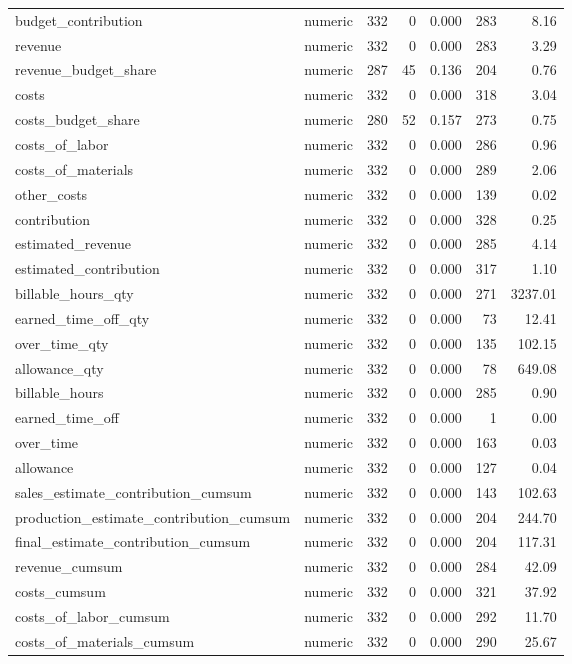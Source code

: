 \begin{landscape}
\begin{longtable}[t]{llrrrrr}
budget\_contribution & numeric & 332 & 0 & 0.000 & 283 & 8.16\\
revenue & numeric & 332 & 0 & 0.000 & 283 & 3.29\\
revenue\_budget\_share & numeric & 287 & 45 & 0.136 & 204 & 0.76\\
costs & numeric & 332 & 0 & 0.000 & 318 & 3.04\\
costs\_budget\_share & numeric & 280 & 52 & 0.157 & 273 & 0.75\\
costs\_of\_labor & numeric & 332 & 0 & 0.000 & 286 & 0.96\\
costs\_of\_materials & numeric & 332 & 0 & 0.000 & 289 & 2.06\\
other\_costs & numeric & 332 & 0 & 0.000 & 139 & 0.02\\
contribution & numeric & 332 & 0 & 0.000 & 328 & 0.25\\
estimated\_revenue & numeric & 332 & 0 & 0.000 & 285 & 4.14\\
estimated\_contribution & numeric & 332 & 0 & 0.000 & 317 & 1.10\\
billable\_hours\_qty & numeric & 332 & 0 & 0.000 & 271 & 3237.01\\
earned\_time\_off\_qty & numeric & 332 & 0 & 0.000 & 73 & 12.41\\
over\_time\_qty & numeric & 332 & 0 & 0.000 & 135 & 102.15\\
allowance\_qty & numeric & 332 & 0 & 0.000 & 78 & 649.08\\
billable\_hours & numeric & 332 & 0 & 0.000 & 285 & 0.90\\
earned\_time\_off & numeric & 332 & 0 & 0.000 & 1 & 0.00\\
over\_time & numeric & 332 & 0 & 0.000 & 163 & 0.03\\
allowance & numeric & 332 & 0 & 0.000 & 127 & 0.04\\
sales\_estimate\_contribution\_cumsum & numeric & 332 & 0 & 0.000 & 143 & 102.63\\
production\_estimate\_contribution\_cumsum & numeric & 332 & 0 & 0.000 & 204 & 244.70\\
final\_estimate\_contribution\_cumsum & numeric & 332 & 0 & 0.000 & 204 & 117.31\\
revenue\_cumsum & numeric & 332 & 0 & 0.000 & 284 & 42.09\\
costs\_cumsum & numeric & 332 & 0 & 0.000 & 321 & 37.92\\
costs\_of\_labor\_cumsum & numeric & 332 & 0 & 0.000 & 292 & 11.70\\
costs\_of\_materials\_cumsum & numeric & 332 & 0 & 0.000 & 290 & 25.67\\

\end{longtable}
\end{landscape}
